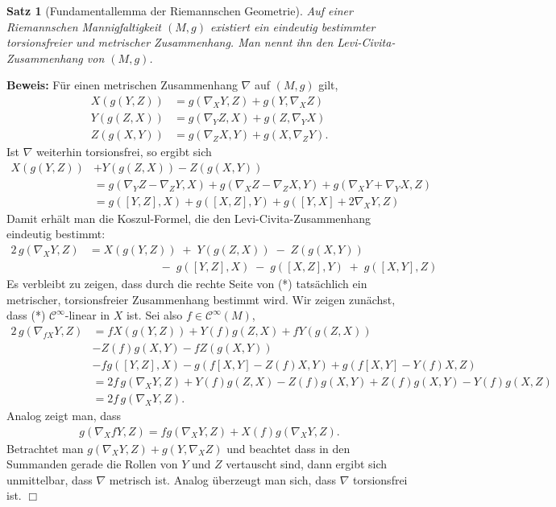 \documentclass[12pt,a4paper]{article}
\newtheorem{Satz}[Lemma]{Satz}
\def\proof{\noindent\textbf{Beweis:}\quad}
\def\qed{\quad\hfill\ensuremath{\Box}}
\begin{document}
\begin{Satz}[Fundamentallemma der Riemannschen Geometrie]
Auf einer Riemannschen Mannigfaltigkeit $(M, g)$ existiert ein eindeutig bestimmter torsionsfreier und
metrischer Zusammenhang.  Man nennt ihn den {\em Levi-Civita-Zusammenhang } von $(M,g)$.
\end{Satz}
\proof
F\"ur einen metrischen Zusammenhang $\nabla$ auf $(M,g)$ gilt,
\begin{align*}
X(g(Y,Z)) &= g(\nabla_X Y,Z) + g(Y,\nabla_X Z)\\
Y(g(Z,X)) &= g(\nabla_Y Z,X) + g(Z,\nabla_Y X)\\
Z(g(X,Y)) &= g(\nabla_Z X,Y) + g(X,\nabla_Z Y).
\end{align*} 
Ist $\nabla$ weiterhin torsionsfrei, so ergibt sich
\begin{align*}
X(g(Y,Z)) &+ Y(g(Z,X)) - Z(g(X,Y)) \\ &= g(\nabla_Y Z - \nabla_Z Y, X)
+ g(\nabla_X  Z - \nabla_Z X  ,Y) + g(\nabla_X Y +\nabla_Y X,Z)\\
&= g([Y,Z],X) + g([X,Z],Y) + g([Y,X] + 2\nabla_X Y,Z)
\end{align*}
Damit erh\"alt man die Koszul-Formel, die den Levi-Civita-Zusammenhang eindeutig bestimmt:
\begin{align*}
2\,g(\nabla_XY, Z)
& = X(g(Y, Z)) \;+\; Y(g(Z,X)) \;-\; Z(g(X,Y)) \\[1ex]
& \phantom{xx.xxxxxxxx} \;-\; g([Y,Z],X) \;-\; g([X,Z],Y) \;+\;
g([X,Y],Z)\tag{*}
\end{align*}
Es verbleibt zu zeigen, dass durch die rechte Seite von (*) tats\"achlich ein
metrischer, torsionsfreier Zusammenhang bestimmt wird. Wir zeigen zun\"achst, dass
(*) $\mathcal C^\infty$-linear in $X$ ist. Sei also $f\in\mathcal C^\infty(M)$,
\begin{align*}
2\,g(\nabla_{fX}Y, Z) &= f X(g(Y,Z)) + Y(f)g(Z,X) + f Y(g(Z,X)) \\ &- Z(f)g(X,Y)
- fZ(g(X,Y))\\
&- fg([Y,Z],X) - g(f[X,Y] - Z(f)X,Y) + 
g(f[X,Y] - Y(f)X,Z)\\
&= 2f\,g(\nabla_X Y,Z) + Y(f)g(Z,X) - Z(f)g(X,Y) + Z(f)g(X,Y) - Y(f)g(X,Z)\\
&=2f\,g(\nabla_X Y,Z).
\end{align*}
Analog zeigt man, dass
\begin{align*}
g(\nabla_X fY,Z) = fg(\nabla_X Y,Z) + X(f)g(\nabla_X Y,Z).
\end{align*}
Betrachtet man $g(\nabla_X Y,Z)+g(Y,\nabla_X Z)$ und beachtet dass in den
Summanden gerade die Rollen von $Y$ und $Z$ vertauscht sind, dann ergibt sich
unmittelbar, dass $\nabla$ metrisch ist. Analog \"uberzeugt man sich, dass
$\nabla$ torsionsfrei ist.
\qed
\end{document}
